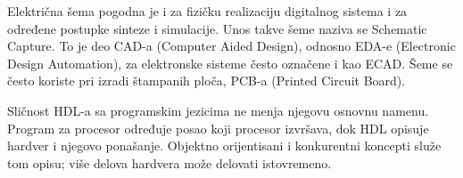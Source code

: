 Električna šema pogodna je i za fizičku realizaciju digitalnog sistema i za određene postupke sinteze i simulacije. Unos takve šeme naziva se Schematic Capture. To je deo CAD-a (Computer Aided Design), odnosno EDA-e (Electronic Design Automation), za elektronske sisteme često označene i kao ECAD. Šeme se često koriste pri izradi štampanih ploča, PCB-a (Printed Circuit Board).

Sličnost HDL-a sa programskim jezicima ne menja njegovu osnovnu namenu. Program za procesor određuje posao koji procesor izvršava, dok HDL opisuje hardver i njegovo ponašanje. Objektno orijentisani i konkurentni koncepti služe tom opisu; više delova hardvera može delovati istovremeno.
